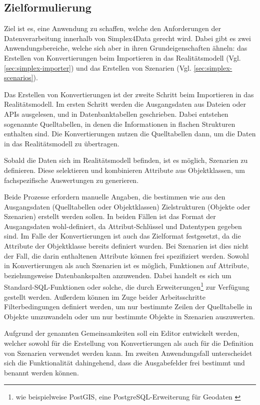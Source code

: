 \subsection{Zielformulierung}

Ziel ist es, eine Anwendung zu schaffen, welche den Anforderungen der Datenverarbeitung innerhalb von Simplex4Data gerecht wird. Dabei gibt es zwei Anwendungsbereiche, welche sich aber in ihren Grundeigenschaften ähneln: das Erstellen von Konvertierungen beim Importieren in das Realitätsmodell (Vgl. \ref{sec:simplex-importer}) und das Erstellen von Szenarien (Vgl. \ref{sec:simplex-scenarios}).

Das Erstellen von Konvertierungen ist der zweite Schritt beim Importieren in das Realitätsmodell. Im ersten Schritt werden die Ausgangsdaten aus Dateien oder APIs ausgelesen, und in Datenbanktabellen geschrieben. Dabei entstehen sogenannte Quelltabellen, in denen die Informationen in flachen Strukturen enthalten sind. Die Konvertierungen nutzen die Quelltabellen dann, um die Daten in das Realitätsmodell zu übertragen.

Sobald die Daten sich im Realitätsmodell befinden, ist es möglich, Szenarien zu definieren. Diese selektieren und kombinieren Attribute aus Objektklassen, um fachspezifische Auswertungen zu generieren.

Beide Prozesse erfordern manuelle Angaben, die bestimmen wie aus den Ausgangsdaten (Quelltabellen oder Objektklassen) Zielstrukturen (Objekte oder Szenarien) erstellt werden sollen. In beiden Fällen ist das Format der Ausgangsdaten wohl-definiert, da Attribut-Schlüssel und Datentypen gegeben sind. Im Falle der Konvertierungen ist auch das Zielformat festgesetzt, da die Attribute der Objektklasse bereits definiert wurden. Bei Szenarien ist dies nicht der Fall, die darin enthaltenen Attribute können frei spezifiziert werden. Sowohl in Konvertierungen als auch Szenarien ist es möglich, Funktionen auf Attribute, beziehungsweise Datenbankspalten anzuwenden. Dabei handelt es sich um Standard-\ac{SQL}-Funktionen oder solche, die durch Erweiterungen\footnote{wie beispielweise PostGIS, eine PostgreSQL-Erweiterung für Geodaten \parencite{postgispscPostGIS}} zur Verfügung gestellt werden. Außerdem können im Zuge beider Arbeitsschritte Filterbedingungen definiert werden, um nur bestimmte Zeilen der Quelltabelle in Objekte umzuwandeln oder um nur bestimmte Objekte in Szenarien auszuwerten.

Aufgrund der genannten Gemeinsamkeiten soll ein Editor entwickelt werden, welcher sowohl für die Erstellung von Konvertierungen als auch für die Definition von Szenarien verwendet werden kann. Im zweiten Anwendungsfall unterscheidet sich die Funktionalität dahingehend, dass die Ausgabefelder frei bestimmt und benannt werden können.

